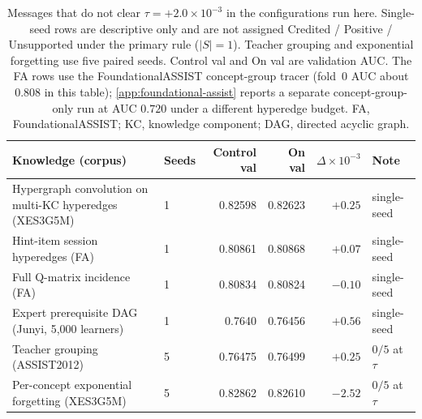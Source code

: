 \begin{table}[t]
\caption{Messages that do not clear $\tau{=}{+}2.0\times 10^{-3}$ in the
configurations run here. Single-seed rows are descriptive only and are
not assigned Credited / Positive / Unsupported under the primary rule
($|S|{=}1$). Teacher grouping and exponential forgetting use five paired
seeds. Control val and On val are validation AUC. The FA rows use the
FoundationalASSIST concept-group tracer (fold~0 AUC about $0.808$ in
this table); \ref{app:foundational-assist} reports a separate
concept-group-only run at AUC $0.720$ under a different hyperedge
budget. FA, FoundationalASSIST; KC, knowledge component; DAG, directed
acyclic graph.}
\label{tab:negative-knowledge}
\centering
\footnotesize
\setlength{\tabcolsep}{4pt}
\begin{tabularx}{\linewidth}{@{}>{\raggedright\arraybackslash}Xlrrrl@{}}
\toprule
Knowledge (corpus) & Seeds & Control val & On val & $\Delta\times 10^{-3}$ & Note \\
\midrule
Hypergraph convolution on multi-KC hyperedges (XES3G5M) & 1 & 0.82598 & 0.82623 & $+0.25$ & single-seed \\
Hint-item session hyperedges (FA) & 1 & 0.80861 & 0.80868 & $+0.07$ & single-seed \\
Full Q-matrix incidence (FA) & 1 & 0.80834 & 0.80824 & $-0.10$ & single-seed \\
Expert prerequisite DAG (Junyi, 5{,}000 learners) & 1 & 0.7640 & 0.76456 & $+0.56$ & single-seed \\
Teacher grouping (ASSIST2012) & 5 & 0.76475 & 0.76499 & $+0.25$ & $0/5$ at $\tau$ \\
Per-concept exponential forgetting (XES3G5M) & 5 & 0.82862 & 0.82610 & $-2.52$ & $0/5$ at $\tau$ \\
\bottomrule
\end{tabularx}
\end{table}

